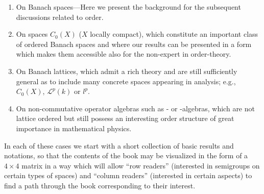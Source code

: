 \begin{enumerate}[label=Part-\Alph*, align=left]
 \item 
 On Banach spaces---Here we present the background for the subsequent discussions related to order.
 
 \item 
 On spaces $C_{0}(X)$ ($X$ locally compact), which constitute an important class of ordered Banach spaces and where our results can be presented in a form which makes them accessible also for the non-expert in order-theory.
 
 \item 
 On Banach lattices, which admit a rich theory and are still sufficiently general as to include many concrete spaces appearing in analysis; e.g., $C_0(X)$, $\mathcal{L}^p(k)$ or $l^p$.
 
 \item 
 On non-commutative operator algebras such as \CA- or \WA-algebras, which are not lattice ordered but still possess an interesting order structure of great importance in mathematical physics.
 
 \end{enumerate}
 In each of these cases we start with a short collection of basic results and notations, so that the contents of the book may be visualized in the form of a $4 \times 4$ matrix in a way which will allow \enquote{row readers} (interested in semigroups on certain types of spaces) and \enquote{column readers} (interested in certain aspects) to find a path through the book corresponding to their interest.
 
